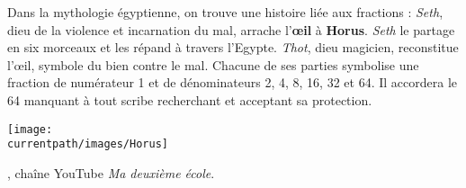\vspace*{-7mm}
\begin{changemargin}{-10mm}{-10mm}

\end{changemargin}
\vspace*{-13mm}
\begin{debat} 
   Dans la mythologie égyptienne, on trouve une histoire liée aux fractions : {\it Seth}, dieu de la violence et incarnation du mal, arrache l’{\bf œil} à {\bf Horus}. {\it Seth} le partage en six morceaux et les répand à travers l’Egypte. {\it Thot}, dieu magicien, reconstitue l’œil, symbole du bien contre le mal. Chacune de ses parties symbolise une fraction de numérateur 1 et de dénominateurs 2, 4, 8, 16, 32 et 64. Il accordera le 64 manquant à tout scribe recherchant et acceptant sa protection.
   \begin{center}
      \texttt{[image: \\currentpath/images/Horus]}
   \end{center}
   \bigskip
   \begin{cadre}[B2][F4]
      \begin{center}
         , chaîne YouTube {\it Ma deuxième école}.
      \end{center}
   \end{cadre}
\end{debat}